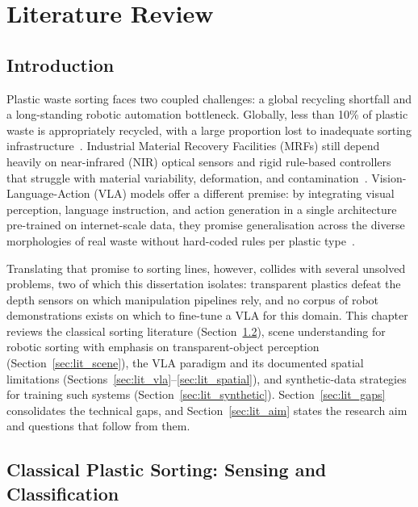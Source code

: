 
\chapter{Literature Review}
\label{ch:litreview}

\section{Introduction}
\label{sec:lit_intro}

Plastic waste sorting faces two coupled challenges: a global recycling shortfall and a long-standing robotic automation bottleneck. Globally, less than 10\% of plastic waste is appropriately recycled, with a large proportion lost to inadequate sorting infrastructure~\citep{ramos2024}. Industrial Material Recovery Facilities (MRFs) still depend heavily on near-infrared (NIR) optical sensors and rigid rule-based controllers that struggle with material variability, deformation, and contamination~\citep{lubongo2024, kroell2022}. Vision-Language-Action (VLA) models offer a different premise: by integrating visual perception, language instruction, and action generation in a single architecture pre-trained on internet-scale data, they promise generalisation across the diverse morphologies of real waste without hard-coded rules per plastic type~\citep{sapkota2025, kawaharazuka2025}.

Translating that promise to sorting lines, however, collides with several unsolved problems, two of which this dissertation isolates: transparent plastics defeat the depth sensors on which manipulation pipelines rely, and no corpus of robot demonstrations exists on which to fine-tune a VLA for this domain. This chapter reviews the classical sorting literature (Section~\ref{sec:lit_classical}), scene understanding for robotic sorting with emphasis on transparent-object perception (Section~\ref{sec:lit_scene}), the VLA paradigm and its documented spatial limitations (Sections~\ref{sec:lit_vla}--\ref{sec:lit_spatial}), and synthetic-data strategies for training such systems (Section~\ref{sec:lit_synthetic}). Section~\ref{sec:lit_gaps} consolidates the technical gaps, and Section~\ref{sec:lit_aim} states the research aim and questions that follow from them.

\section{Classical Plastic Sorting: Sensing and Classification}
\label{sec:lit_classical}

